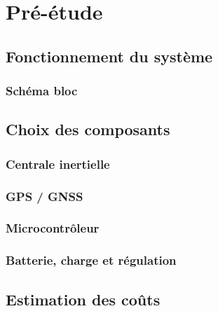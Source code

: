 \section{Pré-étude} \label{sec:Pre-Etude}

\subsection{Fonctionnement du système} \label{ssec:Fonctionnement}
\subsubsection{Schéma bloc} \label{sssec:Schema-bloc}

\subsection{Choix des composants} \label{ssec:Choix-composant}

\subsubsection{Centrale inertielle} \label{sssec:Choix-Centrale-inertielle}

\subsubsection{GPS / GNSS} \label{sssec:Choix-GPS}

\subsubsection{Microcontrôleur} \label{sssec:Choix-MCU}

\subsubsection{Batterie, charge et régulation} \label{sssec:Choix-Batterie-charge}

\subsection{Estimation des coûts} \label{sssec:Estimation-Couts}
